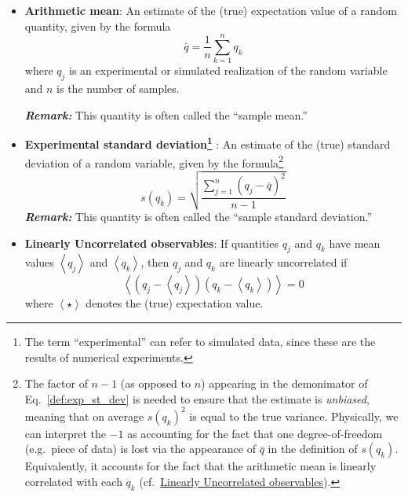 \begin{itemize}
\item {\bf Arithmetic mean}: An estimate of the (true) expectation value of a random quantity, given by the formula
  \begin{equation}
    \bar{q} = \dfrac{1}{n} \sum_{k=1}^{n} q_k \label{def:arith_mean}
  \end{equation}
  where $q_j$ is an experimental or simulated realization of the random variable and $n$ is the number of samples. 
\smallskip 

\textbf{\textit{Remark:}} This quantity is often called the ``sample mean.''

\item {\bf Experimental standard deviation\footnote{
      The term ``experimental'' can refer to simulated data, since these are the results of numerical experiments.
}
}: An estimate of the (true) standard deviation of a random variable, given by the formula\footnote{The factor of $n-1$ (as opposed to $n$) appearing in the demonimator of Eq.~\ref{def:exp_st_dev} is needed to ensure that the estimate is {\it unbiased}, meaning that on average $s\left(q_k\right)^2$ is equal to the true variance. Physically, we can interpret the $-1$ as accounting for the fact that one degree-of-freedom (e.g.\ piece of data) is lost via the appearance of $\bar{q}$ in the definition of $s\left(q_k\right)$.  Equivalently, it accounts for the fact that the arithmetic mean is linearly correlated with each $q_k$ (cf.\ \hyperref[def:unc_obs]{Linearly Uncorrelated observables}).}
  \begin{equation}
    s\left(q_k\right) = \sqrt{\dfrac{\sum_{j=1}^n\left(q_j - \bar{q}\right)^2}{n-1}} \label{def:exp_st_dev}
  \end{equation}
  \smallskip
  \textbf{\textit{Remark:}} This quantity is often called the ``sample standard deviation.'' 


  \item {\bf Linearly Uncorrelated observables}:  If quantities $q_j$ and $q_k$ have mean values $\left< q_j \right> $ and $\left< q_k \right>$, then $q_j$ and $q_k$ are linearly uncorrelated if
\begin{equation}
  \left< \left(q_j - \left<q_j\right> \right) \left(q_k - \left<q_k\right> \right) \right>=0 \label{def:unc_obs}
\end{equation}
where $\left< \star \right>$ denotes the (true) expectation value.


\end{itemize}
